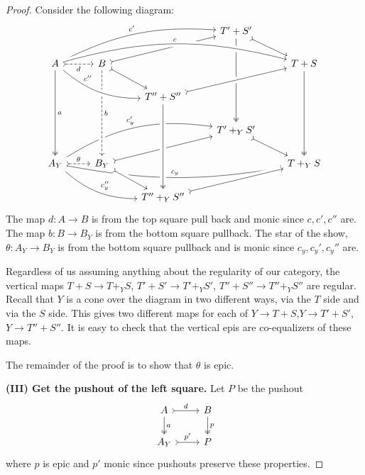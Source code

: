 \documentclass[12pt]{article}
\newcommand{\from}{\colon}
\renewcommand{\(}{\left(}
\renewcommand{\)}{\right)}
\renewcommand{\{}{\left\lbrace}
\renewcommand{\}}{\right\rbrace}
\theoremstyle{remark}
\theoremstyle{definition}
\begin{document}
\begin{proof}
 	Consider the following diagram:
 	\[
 	\begin{tikzcd}
	 	{} &
	 	{} &
	 	{} &
	 	{T'+S'} 
		 	\ar[rd,rightarrowtail]
		 	\ar[ddd,twoheadrightarrow]&
	 	{} \\
	 	{A} 
		 	\ar[ddd,twoheadrightarrow,"a"]  
			\ar[rrru,bend left=15,"c'"] &
	 	{B} 
		 	\ar[urr,rightarrowtail]
		 	\ar[dr,rightarrowtail] &
	 	{} &
	 	{} &
	 	{T+S} 
		 	\ar[ddd,twoheadrightarrow]\\
	 	{} &
	 	{} &
	 	{T''+S''} &
	 	{} &
	 	{} \\
	 	{} &
	 	{} &
	 	{} &
	 	{T'+_YS'} 
		 	\ar[dr,rightarrowtail]&
	 	{} \\
	 	{A_Y} 
		 	\ar[rrru,bend left=20,"c'_y"] 
		 	\ar[r,rightarrowtail, dashed,"\theta"]
		 	\ar[rrd,bend right=20,"c''_y"] &
	 	{B_Y} 
		 	\ar[rru,rightarrowtail] &
	 	{} &
	 	{} &
	 	{T+_YS} \\
	 	{} &
	 	{} &
	 	{T''+_YS''} &
	 	{} &
	 	{}
	 	\ar[from=2-2,to=5-2,crossing over,dashed,"b"]
	 	\ar[from=2-1,to=3-3,crossing over, bend right=20,  "c''" near start]
	 	\ar[from=3-3,to=2-5,crossing over,rightarrowtail]
	 	\ar[from=2-1,to=2-5,crossing over,bend left=15,"c"]
	 	\ar[from=5-1,to=5-5,bend right=10,"c_y"]
	 	\ar[from=3-3,to=6-3,crossing over,twoheadrightarrow]
	 	\ar[from=5-2,to=6-3,crossing over,rightarrowtail]
	 	\ar[from=6-3,to=5-5,crossing over,rightarrowtail]
	 	\ar[from=2-1,to=2-2,rightarrowtail,dashed,swap,"d"]
 	\end{tikzcd}
 	\]
 	The map $d \from A \to B$ is from the top square pull back and monic since $c,c',c''$ are. The map $b \from B \to B_Y$ is from the bottom square pullback.  The star of the show, $\theta \from A_Y \to B_Y$ is from the bottom square pullback and is monic since $c_y,c_y',c_y''$ are.  
 	
 	Regardless of us assuming anything about the regularity of our category, the vertical maps $T+S \to T+_YS$, $T'+S' \to T'+_YS'$, $T''+S'' \to T''+_YS''$ are regular.  Recall that $Y$ is a cone over the diagram in two different ways, via the $T$ side and via the $S$ side. This gives two different maps for each of $Y \to T+S$,$Y \to T'+S'$,$Y \to T''+S''$.  It is easy to check that the vertical epis are co-equalizers of these maps.  
 	
 	The remainder of the proof is to show that $\theta$ is epic.
 	
 	\textbf{(III) Get the pushout of the left square.} Let $P$ be the pushout
 	\[
	 \begin{tikzcd}
		 {A} 
			 \ar[r,rightarrowtail,"d"]
			 \ar[d,twoheadrightarrow,"a"] &
		 {B} \ar[d,twoheadrightarrow,"p"] \\
		 {A_Y} \ar[r,rightarrowtail, "p'"] &
		 {P} 
	 \end{tikzcd}
 	\] 
 	where $p$ is epic and $p'$ monic since pushouts preserve these properties.
 	

\end{proof}
\end{document}
